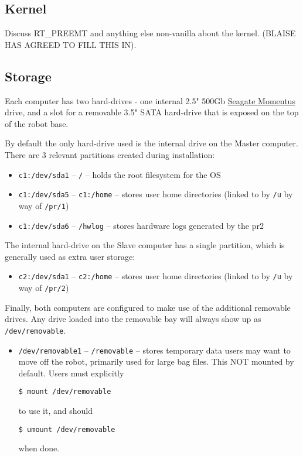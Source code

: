 \subsection{Kernel}
Discuss RT\_PREEMT and anything else non-vanilla about the kernel.  (BLAISE HAS AGREED TO FILL THIS IN).

\subsection{Storage}
Each computer has two hard-drives - one internal 2.5" 500Gb
\href{http://www.seagate.com/www/en-us/products/laptops/momentus/momentus_7200.4_g_force/}{Seagate
  Momentus} drive, and a slot for a removable 3.5" SATA hard-drive
that is exposed on the top of the robot base.

By default the only hard-drive used is the internal drive on the
Master computer.  There are 3 relevant partitions created during
installation:
\begin{itemize}
\item  \texttt{c1:/dev/sda1} -- \texttt{/} -- holds the root filesystem for the OS
\item  \texttt{c1:/dev/sda5} -- \texttt{c1:/home} -- stores user home directories (linked to by \texttt{/u} by way of \texttt{/pr/1})
\item  \texttt{c1:/dev/sda6} -- \texttt{/hwlog} -- stores hardware logs generated by the pr2
\end{itemize}

The internal hard-drive on the Slave computer has a single partition,
which is generally used as extra user storage:
\begin{itemize}
\item  \texttt{c2:/dev/sda1} -- \texttt{c2:/home} -- stores user home directories (linked to by \texttt{/u} by way of \texttt{/pr/2})
\end{itemize}

Finally, both computers are configured to make use of the additional
removable drives.  Any drive loaded into the removable bay will always
show up as \texttt{/dev/removable}.
\begin{itemize}
\item \texttt{/dev/removable1} -- \texttt{/removable} -- stores
  temporary data users may want to move off the robot, primarily used
  for large bag files.  This NOT mounted by default.  Users must
  explicitly
\begin{verbatim}
$ mount /dev/removable
\end{verbatim}
to use it, and should 
\begin{verbatim}
$ umount /dev/removable
\end{verbatim}
when done.
\end{itemize}

